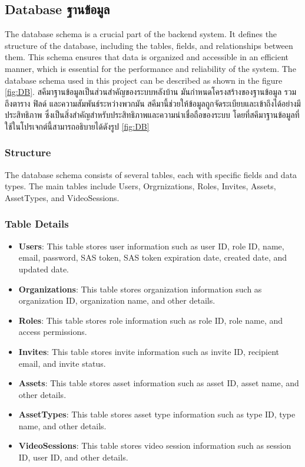 \subsection{\ifenglish Database \else ฐานข้อมูล \fi}

\ifenglish
The database schema is a crucial part of the backend system. It defines the structure of the database, including the tables, fields, and relationships between them. This schema ensures that data is organized and accessible in an efficient manner, which is essential for the performance and reliability of the system. The database schema used in this project can be described as shown in the figure \ref{fig:DB}.
\else
สคีมาฐานข้อมูลเป็นส่วนสำคัญของระบบหลังบ้าน มันกำหนดโครงสร้างของฐานข้อมูล รวมถึงตาราง ฟิลด์ และความสัมพันธ์ระหว่างพวกมัน สคีมานี้ช่วยให้ข้อมูลถูกจัดระเบียบและเข้าถึงได้อย่างมีประสิทธิภาพ ซึ่งเป็นสิ่งสำคัญสำหรับประสิทธิภาพและความน่าเชื่อถือของระบบ โดยที่สคีมาฐานข้อมูลที่ใช้ในโปรเจกต์นี้สามารถอธิบายได้ดังรูป \ref{fig:DB}
\fi


\clearpage

\ifenglish
\subsubsection{Structure}
The database schema consists of several tables, each with specific fields and data types. The main tables include Users, Orgrnizations, Roles, Invites, Assets, AssetTypes, and VideoSessions.

\subsubsection{Table Details}
\begin{itemize}
    \item \textbf{Users}: This table stores user information such as user ID, role ID, name, email, password, SAS token, SAS token expiration date, created date, and updated date.
    \item \textbf{Organizations}: This table stores organization information such as organization ID, organization name, and other details.
    \item \textbf{Roles}: This table stores role information such as role ID, role name, and access permissions.
    \item \textbf{Invites}: This table stores invite information such as invite ID, recipient email, and invite status.
    \item \textbf{Assets}: This table stores asset information such as asset ID, asset name, and other details.
    \item \textbf{AssetTypes}: This table stores asset type information such as type ID, type name, and other details.
    \item \textbf{VideoSessions}: This table stores video session information such as session ID, user ID, and other details.
\end{itemize}

